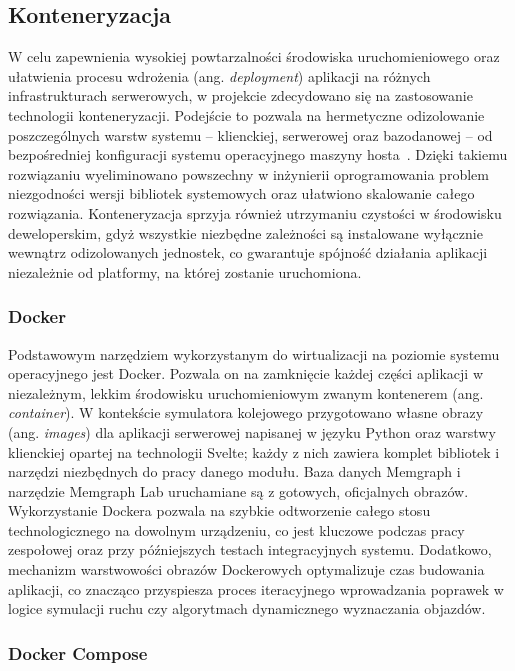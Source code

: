 \documentclass[twoside]{projektInzynierskiMS1z}
\begin{document}
\subsection{Konteneryzacja}

W celu zapewnienia wysokiej powtarzalności środowiska uruchomieniowego oraz ułatwienia
procesu wdrożenia (ang. \emph{deployment}) aplikacji na różnych infrastrukturach
serwerowych, w projekcie zdecydowano się na zastosowanie technologii konteneryzacji.
Podejście to pozwala na hermetyczne odizolowanie poszczególnych warstw systemu --
klienckiej, serwerowej oraz bazodanowej -- od bezpośredniej konfiguracji systemu
operacyjnego maszyny hosta~\cite{docker}. Dzięki takiemu rozwiązaniu wyeliminowano
powszechny w inżynierii oprogramowania problem niezgodności wersji bibliotek systemowych
oraz ułatwiono skalowanie całego rozwiązania. Konteneryzacja sprzyja również utrzymaniu
czystości w środowisku deweloperskim, gdyż wszystkie niezbędne zależności są instalowane
wyłącznie wewnątrz odizolowanych jednostek, co gwarantuje spójność działania aplikacji
niezależnie od platformy, na której zostanie uruchomiona.

\subsubsection{Docker}

Podstawowym narzędziem wykorzystanym do wirtualizacji na poziomie systemu operacyjnego
jest Docker. Pozwala on na zamknięcie każdej części aplikacji w niezależnym, lekkim
środowisku uruchomieniowym zwanym kontenerem (ang. \emph{container}). W kontekście symulatora kolejowego przygotowano własne obrazy
(ang. \emph{images}) dla aplikacji serwerowej napisanej w języku Python oraz
warstwy klienckiej opartej na technologii Svelte; każdy z nich zawiera komplet
bibliotek i narzędzi niezbędnych do pracy danego modułu. Baza danych Memgraph
i narzędzie Memgraph Lab uruchamiane są z gotowych, oficjalnych obrazów. Wykorzystanie Dockera pozwala
na szybkie odtworzenie całego stosu technologicznego na dowolnym urządzeniu, co jest
kluczowe podczas pracy zespołowej oraz przy późniejszych testach integracyjnych systemu.
Dodatkowo, mechanizm warstwowości obrazów Dockerowych optymalizuje czas budowania
aplikacji, co znacząco przyspiesza proces iteracyjnego wprowadzania poprawek w logice symulacji ruchu czy algorytmach dynamicznego wyznaczania objazdów.

\subsubsection{Docker Compose}
\end{document}
